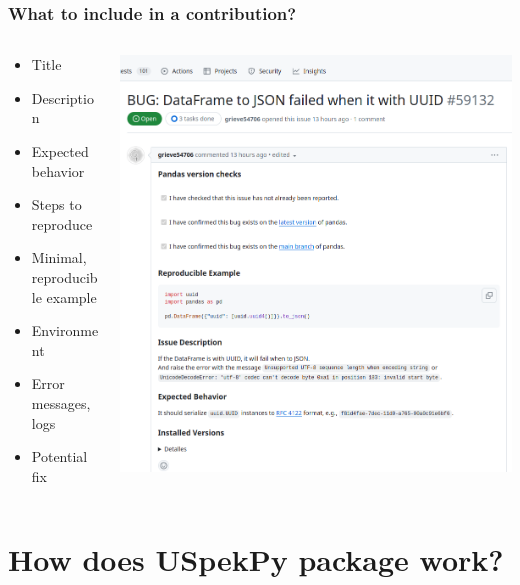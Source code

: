 \documentclass{beamer}
\begin{document}
	\begin{frame}
		\frametitle{What to include in a contribution?}
		\begin{columns}
			\begin{column}{0.3\textwidth}
				\footnotesize
				\begin{itemize}
					\item Title
					\item Description
					\item Expected behavior
					\item Steps to reproduce
					\item Minimal, reproducible example
					\item Environment
					\item Error messages, logs
					\item Potential fix
				\end{itemize}
			\end{column}
			\begin{column}{0.7\textwidth}
				\includegraphics[width=\textwidth]{pandas_issue}
			\end{column}
		\end{columns}
	\end{frame}
	
	\section{How does USpekPy package work?}
	
\end{document}
